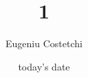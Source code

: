 \documentclass[12pt, a4paper]{report}
\title{1}
\author{Eugeniu Costetchi}
\date{today's date}
\begin{document}



\tableofcontents
\pagebreak

\pagestyle{fancy}
\fancyhf{}
\rhead{\slshape\DelAuthor}
\lhead{\slshape\nouppercase{\rightmark}}
\cfoot{\thepage}

\renewcommand{\thesection}{\arabic{section}}
 
%





%

 
\end{document}
